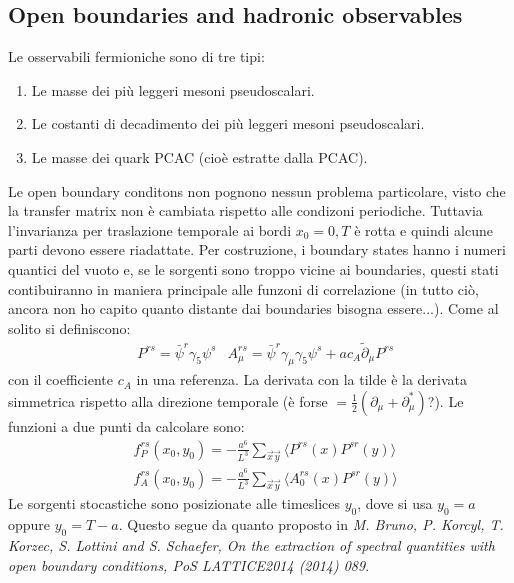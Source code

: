 \documentclass[12pt,a4paper,openright]{article}
\newcommand{\la}{\langle}
\newcommand{\ra}{\rangle}
\newcommand{\colg}{\textcolor{PineGreen}}
\newcommand{\colr}{\textcolor{BrickRed}}
\begin{document}
\subsection{Open boundaries and hadronic observables}
Le osservabili fermioniche sono di tre tipi:
\begin{enumerate}
  \item Le masse dei più leggeri mesoni pseudoscalari.
  \item Le costanti di decadimento dei più leggeri mesoni pseudoscalari.
  \item Le masse dei quark PCAC (cioè estratte dalla PCAC).
\end{enumerate}
Le open boundary conditons non pognono nessun problema particolare, visto che la transfer matrix non è cambiata rispetto alle condizoni periodiche.
\colg{
  Tuttavia l'invarianza per traslazione temporale ai bordi $x_0 = 0,T$ è rotta e quindi alcune parti devono essere riadattate.
  Per costruzione, i boundary states hanno i numeri quantici del vuoto e, se le sorgenti sono troppo vicine ai boundaries, questi stati contibuiranno in maniera principale alle funzoni di correlazione
}(\colr{in tutto ciò, ancora non ho capito quanto distante dai boundaries bisogna essere...}).
Come al solito si definiscono:
\begin{equation*}
  \begin{aligned}
    & P^{rs} = \bar\psi^r \gamma_5 \psi^s & A_\mu^{rs} = \bar \psi^r \gamma_\mu \gamma_5 \psi^s + ac_A \tilde{\partial}_\mu P^{rs}
  \end{aligned}
\end{equation*}
con il coefficiente $c_A$ in una referenza.
La derivata con la tilde è la derivata simmetrica rispetto alla direzione temporale (è forse $= \frac{1}{2}\left(\partial_\mu + \partial_\mu^*\right)$?).
Le funzioni a due punti da calcolare sono:
\begin{equation*}
  \begin{aligned}
    & f_P^{rs} (x_0,y_0) = - \frac{a^6}{L^3} \sum_{\vec x \vec y} \la P^{rs}(x) P^{sr}(y) \ra \\
    & f_A^{rs} (x_0,y_0) = - \frac{a^6}{L^3} \sum_{\vec x \vec y} \la A_0^{rs}(x) P^{sr}(y) \ra
  \end{aligned}
\end{equation*}
Le sorgenti stocastiche sono posizionate alle timeslices $y_0$, dove si usa $y_0 = a$ oppure $y_0 = T-a$.
Questo segue da quanto proposto in \textit{M. Bruno, P. Korcyl, T. Korzec, S. Lottini and S. Schaefer, On the extraction of spectral quantities with open boundary conditions, PoS LATTICE2014 (2014) 089}.
\end{document}
